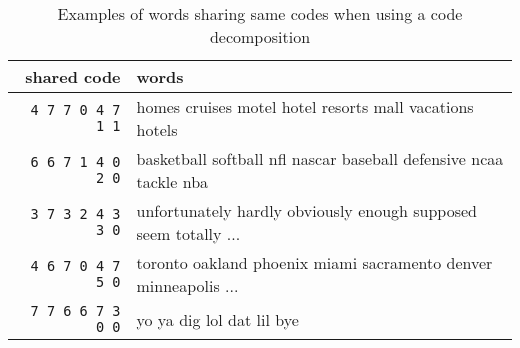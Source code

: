 \documentclass{article} \usepackage{iclr2018_conference_review,times}
\begin{document}
\begin{table}[h]
\begin{center}
    \begin{tabular}{r|l}
    \hline \hline
    {\bf shared code}  & {\bf words}  \\
    \hline
    \texttt{4 7 7 0 4 7 1 1} & homes cruises motel hotel resorts mall vacations hotels\\
    \texttt{6 6 7 1 4 0 2 0} & basketball softball nfl nascar baseball defensive ncaa tackle nba\\
    \texttt{3 7 3 2 4 3 3 0} & unfortunately hardly obviously enough supposed seem totally ...\\
    \texttt{4 6 7 0 4 7 5 0} & toronto oakland phoenix miami sacramento denver minneapolis ...\\
    \texttt{7 7 6 6 7 3 0 0} & yo ya dig lol dat lil bye\\
    \hline \hline
    \end{tabular}
    \caption{Examples of words sharing same codes when using a  code decomposition}
    \label{table:shared_codes}
\end{center}
\end{table}
\end{document}
